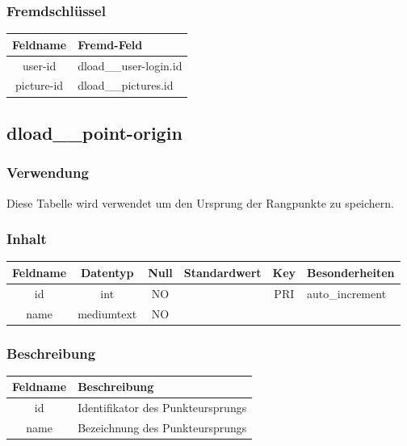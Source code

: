 \subsubsection{Fremdschlüssel}
\begin{table}[H]
	\begin{tabular}{|c|p{12.5cm}|}
		\hline
		\textbf{Feldname} & \textbf{Fremd-Feld} \\ \hline
		user-id & dload\_\_user-login.id \\ \hline
		picture-id & dload\_\_pictures.id \\ \hline
	\end{tabular}
\end{table}
\subsection{dload\_\_point-origin}
\subsubsection{Verwendung} Diese Tabelle wird verwendet um den Ursprung der Rangpunkte zu speichern.
\subsubsection{Inhalt}
\begin{table}[H]
	\begin{tabular}{|c|c|c|c|c|p{3.5cm}|}
		\hline
		\textbf{Feldname} & \textbf{Datentyp} & \textbf{Null} & \textbf{Standardwert} & \textbf{Key}   & \textbf{Besonderheiten} \\ \hline
		id & int & NO &  & PRI & auto\_increment \\ \hline
		name & mediumtext & NO &  &  & \\ \hline
	\end{tabular}
\end{table}
\subsubsection{Beschreibung}
\begin{table}[H]
	\begin{tabular}{|c|p{12cm}|}
		\hline
		\textbf{Feldname} & \textbf{Beschreibung} \\ \hline
		id & Identifikator des Punkteursprungs \\ \hline
		name & Bezeichnung des Punkteursprungs \\ \hline
	\end{tabular}
\end{table}
